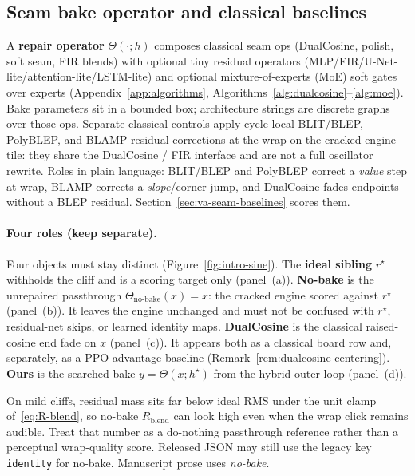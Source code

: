 \subsection{Seam bake operator and classical baselines}
\label{sec:bake}

A \textbf{repair operator} $\Theta(\cdot;h)$ composes classical seam ops (DualCosine, polish, soft seam, FIR blends) with optional tiny residual operators (MLP/FIR/U-Net-lite/attention-lite/LSTM-lite) and optional mixture-of-experts (MoE) soft gates over experts (Appendix~\ref{app:algorithms}, Algorithms~\ref{alg:dualcosine}--\ref{alg:moe}).
Bake parameters sit in a bounded box; architecture strings are discrete graphs over those ops.
Separate classical controls apply cycle-local BLIT/BLEP, PolyBLEP, and BLAMP residual corrections at the wrap on the cracked engine tile: they share the DualCosine / FIR interface and are not a full oscillator rewrite.
Roles in plain language: BLIT/BLEP and PolyBLEP correct a \emph{value} step at wrap, BLAMP corrects a \emph{slope}/corner jump, and DualCosine fades endpoints without a BLEP residual.
Section~\ref{sec:va-seam-baselines} scores them.

\paragraph{Four roles (keep separate).}
\label{sec:four-roles}
Four objects must stay distinct (Figure~\ref{fig:intro-sine}).
The \textbf{ideal sibling} $r^{\star}$ withholds the cliff and is a scoring target only (panel~(a)).
\textbf{No-bake} is the unrepaired passthrough $\Theta_{\mathrm{no\text{-}bake}}(x)=x$: the cracked engine scored against $r^{\star}$ (panel~(b)).
It leaves the engine unchanged and must not be confused with $r^{\star}$, residual-net skips, or learned identity maps.
\textbf{DualCosine} is the classical raised-cosine end fade on $x$ (panel~(c)).
It appears both as a classical board row and, separately, as a PPO advantage baseline (Remark~\ref{rem:dualcosine-centering}).
\textbf{Ours} is the searched bake $y=\Theta(x;h^{\star})$ from the hybrid outer loop (panel~(d)).

On mild cliffs, residual mass sits far below ideal RMS under the unit clamp of~\eqref{eq:R-blend}, so no-bake $R_{\mathrm{blend}}$ can look high even when the wrap click remains audible.
Treat that number as a do-nothing passthrough reference rather than a perceptual wrap-quality score.
Released JSON may still use the legacy key \texttt{identity} for no-bake.
Manuscript prose uses \emph{no-bake}.

